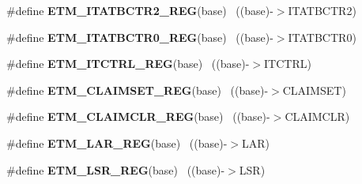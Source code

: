 \begin{DoxyCompactItemize}
\item 
\hypertarget{group___e_t_m___register___accessor___macros_gabaaff853349c573dc5d808c1832ae593}{}\#define {\bfseries E\+T\+M\+\_\+\+I\+T\+A\+T\+B\+C\+T\+R2\+\_\+\+R\+E\+G}(base)                                ~((base)-\/$>$I\+T\+A\+T\+B\+C\+T\+R2)\label{group___e_t_m___register___accessor___macros_gabaaff853349c573dc5d808c1832ae593}

\item 
\hypertarget{group___e_t_m___register___accessor___macros_ga044ab1ed1903b83ec8bf8644fe891ff9}{}\#define {\bfseries E\+T\+M\+\_\+\+I\+T\+A\+T\+B\+C\+T\+R0\+\_\+\+R\+E\+G}(base)                                ~((base)-\/$>$I\+T\+A\+T\+B\+C\+T\+R0)\label{group___e_t_m___register___accessor___macros_ga044ab1ed1903b83ec8bf8644fe891ff9}

\item 
\hypertarget{group___e_t_m___register___accessor___macros_ga869eff0ff03afcb538e3ec9f339a94b8}{}\#define {\bfseries E\+T\+M\+\_\+\+I\+T\+C\+T\+R\+L\+\_\+\+R\+E\+G}(base)                                      ~((base)-\/$>$I\+T\+C\+T\+R\+L)\label{group___e_t_m___register___accessor___macros_ga869eff0ff03afcb538e3ec9f339a94b8}

\item 
\hypertarget{group___e_t_m___register___accessor___macros_ga993d9a7923455e581d4b946e72f5ee53}{}\#define {\bfseries E\+T\+M\+\_\+\+C\+L\+A\+I\+M\+S\+E\+T\+\_\+\+R\+E\+G}(base)                                  ~((base)-\/$>$C\+L\+A\+I\+M\+S\+E\+T)\label{group___e_t_m___register___accessor___macros_ga993d9a7923455e581d4b946e72f5ee53}

\item 
\hypertarget{group___e_t_m___register___accessor___macros_ga7b9dde88cad5db5f12a6d8c4f4c365e1}{}\#define {\bfseries E\+T\+M\+\_\+\+C\+L\+A\+I\+M\+C\+L\+R\+\_\+\+R\+E\+G}(base)                                  ~((base)-\/$>$C\+L\+A\+I\+M\+C\+L\+R)\label{group___e_t_m___register___accessor___macros_ga7b9dde88cad5db5f12a6d8c4f4c365e1}

\item 
\hypertarget{group___e_t_m___register___accessor___macros_gaae6bc29168049fdfd6475f2f0b0d02c2}{}\#define {\bfseries E\+T\+M\+\_\+\+L\+A\+R\+\_\+\+R\+E\+G}(base)                                            ~((base)-\/$>$L\+A\+R)\label{group___e_t_m___register___accessor___macros_gaae6bc29168049fdfd6475f2f0b0d02c2}

\item 
\hypertarget{group___e_t_m___register___accessor___macros_ga9a048c56377ea08f363a29624cc701fd}{}\#define {\bfseries E\+T\+M\+\_\+\+L\+S\+R\+\_\+\+R\+E\+G}(base)                                            ~((base)-\/$>$L\+S\+R)\label{group___e_t_m___register___accessor___macros_ga9a048c56377ea08f363a29624cc701fd}


\end{DoxyCompactItemize}
